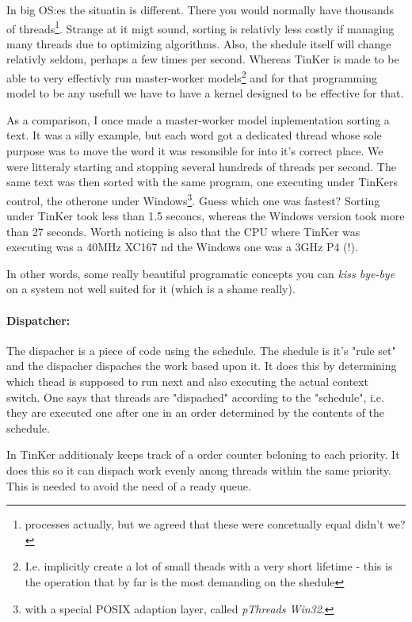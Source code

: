 		In big OS:es the situatin is different. There you would normally have thousands of threads\footnote{processes actually, but we agreed that these were concetually equal didn't we?}. Strange at it migt sound, sorting is relativly less costly if managing many threads due to optimizing algorithms. Also, the shedule itself will change relativly seldom, perhaps a few times per second. Whereas TinKer is made to be able to very effectivly run master-worker models\footnote{I.e. implicitly create a lot of small theads with a very short lifetime - this is the operation that by far is the most demanding on the shedule} and for that programming model to be any usefull we have to have a kernel designed to be effective for that.

		As a comparison, I once made a master-worker model inplementation sorting a text. It was a silly example, but each word got a dedicated thread whose sole purpose was to move the word it was resonsible for into it's correct place. We were litteraly starting and stopping several hundreds of threads per second. The same text was then sorted with the same program, one executing under TinKers control, the otherone under Windows\footnote{with a special POSIX adaption layer, called \textit{pThreads Win32}.}. Guess which one was fastest? Sorting under TinKer took less than 1.5 seconcs, whereas the Windows version took more than 27 seconds. Worth noticing is also that the CPU where TinKer was executing was a 40MHz XC167 nd the Windows one was a 3GHz P4 (!).

		In other words, some really beautiful programatic concepts you can \textit{kiss bye-bye} on a system not well suited for it (which is a shame really).

		\paragraph{Dispatcher:} The dispacher is a piece of code using the schedule. The shedule is it's "rule set" and the dispacher dispaches the work based upon it. It does this by determining which thead is supposed to run next and also executing the actual context switch. One says that threads are "dispached" according to the "schedule", i.e. they are executed one after one in an order determined by the contents of the schedule.
		
		In TinKer additionaly keeps track of a order counter beloning to each priority. It does this so it can dispach work evenly anong threads within the same priority. This is needed to avoid the need of a ready queue.

